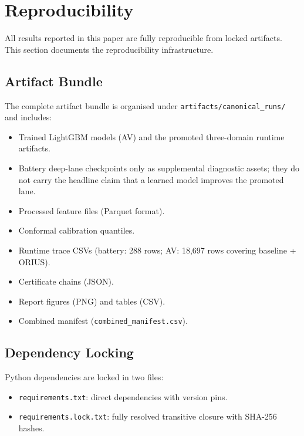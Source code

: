 \section{Reproducibility}\label{sec:reproducibility}

All results reported in this paper are fully reproducible from locked artifacts.
This section documents the reproducibility infrastructure.

\subsection{Artifact Bundle}

The complete artifact bundle is organised under
\texttt{artifacts/canonical\_runs/} and includes:

\begin{itemize}[nosep]
  \item Trained LightGBM models (AV) and the promoted three-domain runtime artifacts.
  \item Battery deep-lane checkpoints only as supplemental diagnostic assets; they do
        not carry the headline claim that a learned model improves the promoted lane.
  \item Processed feature files (Parquet format).
  \item Conformal calibration quantiles.
  \item Runtime trace CSVs (battery: 288 rows; AV: 18{,}697 rows covering
        baseline + ORIUS).
  \item Certificate chains (JSON).
  \item Report figures (PNG) and tables (CSV).
  \item Combined manifest (\texttt{combined\_manifest.csv}).
\end{itemize}

\subsection{Dependency Locking}

Python dependencies are locked in two files:
\begin{itemize}[nosep]
  \item \texttt{requirements.txt}: direct dependencies with version pins.
  \item \texttt{requirements.lock.txt}: fully resolved transitive closure with
        SHA-256 hashes.
\end{itemize}


